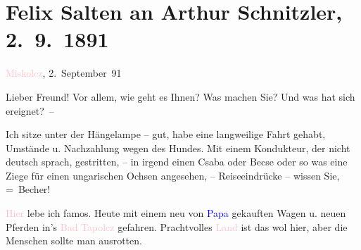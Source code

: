 

\renewcommand{\erwaehntePersonen}{Personen: Bertha Karlsburg, Paula Makay, Philipp Salzmann, Michael Emil Salzmann, Ignaz Salzmann, Theodor Salzmann, Geza Sós}
\renewcommand{\erwaehnteInstitutionen}{Institutionen: Danzer’s Orpheum}
\renewcommand{\erwaehnteOrte}{Orte: Miskolc, Miskolctapolca, Mödling, Ungarn, Wien}
\renewcommand{\erwaehnteWerke}{}
\section[Felix Salten an Arthur Schnitzler, 2. 9. 1891]{Felix Salten an Arthur Schnitzler, 2. 9. 1891}
\nopagebreak{}
\rehead{ }\normalsize\beginnumbering{}
\toendnotes[C]{\smallbreak\pagebreak[2]}
\toendnotes[C]{\smallbreak}
\pstart
           \raggedleft{}{\pb}\textcolor{pink}{Miskolcz}{}\ledrightnote{\textcolor{pink}{Miskolc}}, 2. September 91\pend
           
\pstart
           Lieber Freund! Vor allem, wie geht es Ihnen? Was
               machen Sie? Und was hat sich ereignet? –\pend
           
\pstart
           Ich sitze unter der Hängelampe – gut, habe eine langweilige Fahrt gehabt, Umstände u.
               Nachzahlung wegen des Hundes. Mit einem Kondukteur, der nicht deutsch sprach,
               gestritten, – in irgend einen Csaba oder Becse oder so was eine Ziege für einen
               ungarischen Ochsen angesehen, – Reiseeindrücke – wissen Sie, = Becher!\pend
           
\pstart
           {\pb}\textcolor{pink}{Hier}{}\ledrightnote{{$\rightarrow$}\textcolor{pink}{Miskolc}} lebe ich famos. Heute mit einem neu von \textcolor{blue}{Papa}{}\ledrightnote{{$\rightarrow$}\textcolor{blue}{Philipp Salzmann}} gekauften Wagen u. neuen Pferden in’s
                  \textcolor{pink}{Bad Tapolcz}{}\ledrightnote{\textcolor{pink}{Miskolctapolca}} gefahren. Prachtvolles \textcolor{pink}{Land}{}\ledrightnote{{$\rightarrow$}\textcolor{pink}{Ungarn}} ist das wol hier, aber
               die Menschen sollte man ausrotten.\pend
           
